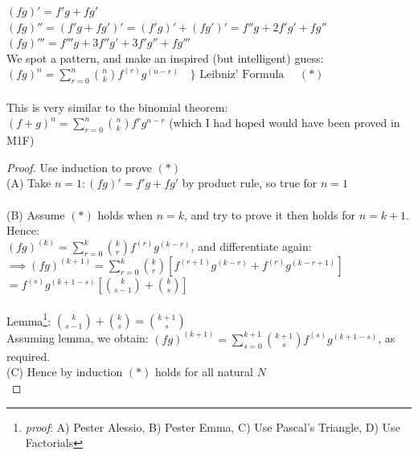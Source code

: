 $(fg)' = f'g + fg'$\\
$(fg)'' = (f'g + fg')' = (f'g)' + (fg')' = f''g + 2f'g' + fg''$\\
$(fg)''' = f'''g + 3f''g' + 3f'g'' + fg'''$\\

We spot a pattern, and make an inspired (but intelligent) guess:\\

$\displaystyle{
(fg)^n = \sum_{r=0}^n {n \choose k} f^{(r)}g^{(n-r)}
} \quad \} \text{ Leibniz' Formula } \quad (*)$\\\\

This is very similar to the binomial theorem:\\
$\displaystyle{
(f+g)^n = \sum_{r=0}^n {n \choose k} f^{r}g^{n-r}
}$ (which I had hoped would have been proved in M1F)\\


\begin{proof}
Use induction to prove $(*)$\\

(A) Take $n = 1: (fg)' = f'g + fg'$ by product rule, so true for $n=1$\\\\

(B) Assume $(*)$ holds when $n=k$, and try to prove it then holds for $n = k + 1$. Hence:\\

$(fg)^{(k)} = \displaystyle{\sum_{r=0}^{k}{k \choose r}f^{(r)}g^{(k-r)} }$, and differentiate again:\\

$\implies (fg)^{(k+1)} = \displaystyle{\sum_{r=0}^{k}{k \choose r} \left[f^{(r+1)}g^{(k-r)} + f^{(r)}g^{(k-r+1)} \right] }$\\

$ = \displaystyle{
f^{(s)}g^{(k+1-s)}\left[{k \choose s-1} + {k \choose s}\right]
}$\\\\

Lemma\footnote{\textit{proof}: A) Pester Alessio, B) Pester Emma, C) Use Pascal's Triangle, D) Use Factorials}: $\displaystyle{ {k \choose s-1} + {k \choose s} = {k+1 \choose s} }$\\

Assuming lemma, we obtain: $(fg)^{(k+1)} = \displaystyle{\sum_{s=0}^{k+1}{k+1 \choose s}f^{(s)}g^{(k+1-s)} }$, as required. \\

(C) Hence by induction $(*)$ holds for all natural $N$\\
\end{proof}

